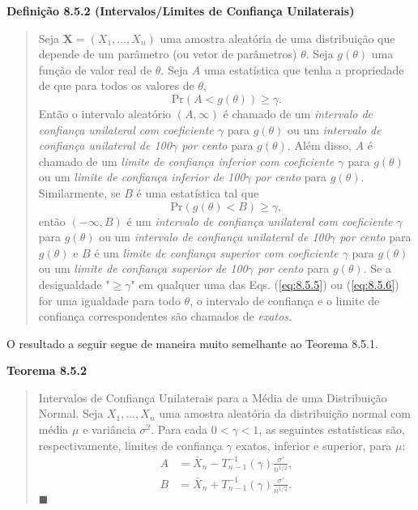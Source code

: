 \vspace{1em}
\noindent\textbf{Definição 8.5.2 (Intervalos/Limites de Confiança Unilaterais)}
\begin{quote}
    Seja $\mathbf{X} = (X_1, \dots, X_n)$ uma amostra aleatória de uma distribuição que depende de um parâmetro (ou vetor de parâmetros) $\theta$. Seja $g(\theta)$ uma função de valor real de $\theta$. Seja $A$ uma estatística que tenha a propriedade de que para todos os valores de $\theta$,
    \begin{equation} \label{eq:8.5.5}
        \text{Pr}(A < g(\theta)) \ge \gamma.
    \end{equation}
    Então o intervalo aleatório $(A, \infty)$ é chamado de um \textit{intervalo de confiança unilateral com coeficiente $\gamma$} para $g(\theta)$ ou um \textit{intervalo de confiança unilateral de 100$\gamma$ por cento} para $g(\theta)$. Além disso, $A$ é chamado de um \textit{limite de confiança inferior com coeficiente $\gamma$} para $g(\theta)$ ou um \textit{limite de confiança inferior de 100$\gamma$ por cento} para $g(\theta)$. Similarmente, se $B$ é uma estatística tal que
    \begin{equation} \label{eq:8.5.6}
        \text{Pr}(g(\theta) < B) \ge \gamma,
    \end{equation}
    então $(-\infty, B)$ é um \textit{intervalo de confiança unilateral com coeficiente $\gamma$} para $g(\theta)$ ou um \textit{intervalo de confiança unilateral de 100$\gamma$ por cento} para $g(\theta)$ e $B$ é um \textit{limite de confiança superior com coeficiente $\gamma$} para $g(\theta)$ ou um \textit{limite de confiança superior de 100$\gamma$ por cento} para $g(\theta)$. Se a desigualdade "$\ge \gamma$" em qualquer uma das Eqs. (\ref{eq:8.5.5}) ou (\ref{eq:8.5.6}) for uma igualdade para todo $\theta$, o intervalo de confiança e o limite de confiança correspondentes são chamados de \textit{exatos}.
\end{quote}
\vspace{1em}

O resultado a seguir segue de maneira muito semelhante ao Teorema 8.5.1.

\vspace{1em}
\noindent\textbf{Teorema 8.5.2}
\begin{quote}
    Intervalos de Confiança Unilaterais para a Média de uma Distribuição Normal. Seja $X_1, \dots, X_n$ uma amostra aleatória da distribuição normal com média $\mu$ e variância $\sigma^2$. Para cada $0 < \gamma < 1$, as seguintes estatísticas são, respectivamente, limites de confiança $\gamma$ exatos, inferior e superior, para $\mu$:
    \begin{align*}
        A &= \bar{X}_n - T_{n-1}^{-1}(\gamma) \frac{\sigma'}{n^{1/2}}, \\
        B &= \bar{X}_n + T_{n-1}^{-1}(\gamma) \frac{\sigma'}{n^{1/2}}.
    \end{align*}
\hfill $\blacksquare$
\end{quote}
\vspace{1em}

